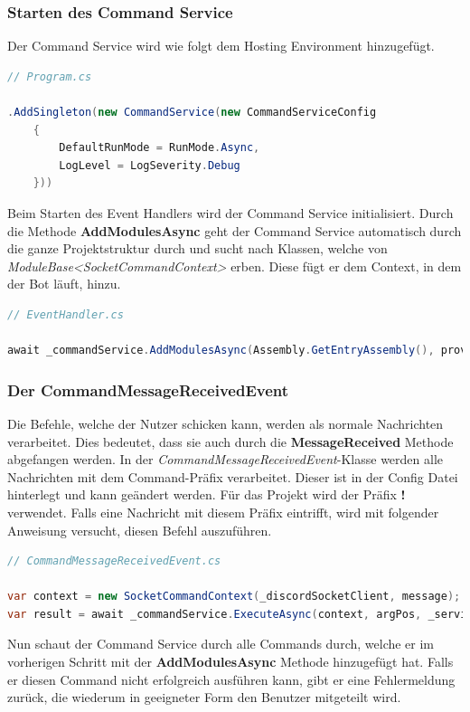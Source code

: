 \documentclass[a4paper, table]{article}
\begin{document}
\subsubsection*{Starten des Command Service}
Der Command Service wird wie folgt dem Hosting Environment hinzugefügt.

\begin{lstlisting}[language=csharp]
// Program.cs

.AddSingleton(new CommandService(new CommandServiceConfig
    {
        DefaultRunMode = RunMode.Async,
        LogLevel = LogSeverity.Debug
    }))
\end{lstlisting}
Beim Starten des Event Handlers wird der Command Service initialisiert. 
Durch die Methode \textbf{AddModulesAsync} geht der Command Service automatisch durch die ganze Projektstruktur durch und sucht nach Klassen, welche von \textit{ModuleBase<SocketCommandContext>} erben. 
Diese fügt er dem Context, in dem der Bot läuft, hinzu.

\begin{lstlisting}[language=csharp]
// EventHandler.cs

await _commandService.AddModulesAsync(Assembly.GetEntryAssembly(), provider);
\end{lstlisting}

\subsubsection*{Der CommandMessageReceivedEvent}
Die Befehle, welche der Nutzer schicken kann, werden als normale Nachrichten verarbeitet. 
Dies bedeutet, dass sie auch durch die \textbf{MessageReceived} Methode abgefangen werden. 
In der \textit{CommandMessageReceivedEvent}-Klasse werden alle Nachrichten mit dem Command-Präfix verarbeitet. 
Dieser ist in der Config Datei hinterlegt und kann geändert werden. 
Für das Projekt wird der Präfix \textbf{!} verwendet. 
Falls eine Nachricht mit diesem Präfix eintrifft, wird mit folgender Anweisung versucht, diesen Befehl auszuführen.

\begin{lstlisting}[language=csharp]
// CommandMessageReceivedEvent.cs

var context = new SocketCommandContext(_discordSocketClient, message);
var result = await _commandService.ExecuteAsync(context, argPos, _serviceProvider);
\end{lstlisting}
Nun schaut der Command Service durch alle Commands durch, welche er im vorherigen Schritt mit der \textbf{AddModulesAsync} Methode hinzugefügt hat. 
Falls er diesen Command nicht erfolgreich ausführen kann, gibt er eine Fehlermeldung zurück, die wiederum in geeigneter Form den Benutzer mitgeteilt wird.
\end{document}
